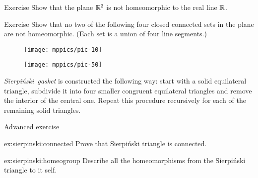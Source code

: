 \begin{thm}{Exercise}\label{ex:R2neR}
Show that the plane $\mathbb{R}^2$ is not homeomorphic to the real line $\mathbb{R}$.
\end{thm}

{

\begin{thm}{Exercise}\label{ex:not-homeo}
Show that no two of the following four closed connected sets in the plane are not homeomorphic.
(Each set is a union of four line segments.)

\begin{figure}[!ht]
\centering
\texttt{[image: mppics/pic-10]}
\end{figure}

\end{thm}

}

{

\begin{wrapfigure}{r}{23 mm}
\vskip-4mm
\centering
\texttt{[image: mppics/pic-50]}
\end{wrapfigure}

\mbox{\emph{Sierpi\'nski gasket}} is constructed the following way:
start with a solid equilateral triangle, subdivide it into four smaller congruent equilateral triangles and remove the interior of the central one.
Repeat this procedure recursively for each of the remaining solid triangles.

}


\begin{thm}{Advanced exercise}\label{ex:sierpinski}

\begin{subthm}{ex:sierpinski:connected}
Prove that Sierpi\'nski triangle is connected.
\end{subthm}

\begin{subthm}{ex:sierpinski:homeogroup}
Describe all the homeomorphisms from the Sierpi\'nski triangle to it self.
\end{subthm}

\end{thm}
